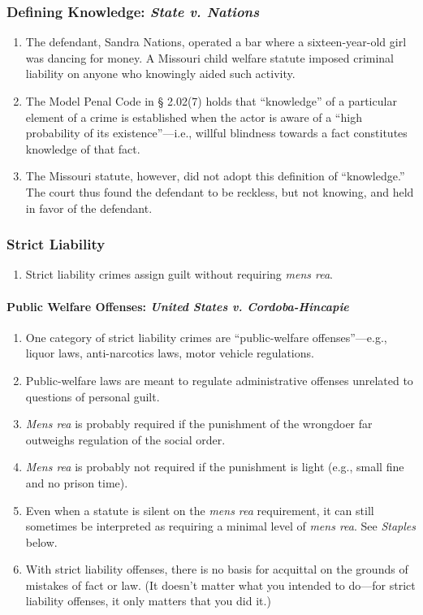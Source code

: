 \subsubsection{Defining Knowledge: \emph{State v. Nations}}

\begin{enumerate}
    \item The defendant, Sandra Nations, operated a bar where a sixteen-year-old girl was dancing for money. A Missouri child welfare statute imposed criminal liability on anyone who knowingly aided such activity.
    \item The Model Penal Code in § 2.02(7) holds that ``knowledge'' of a particular element of a crime is established when the actor is aware of a ``high probability of its existence''---i.e., willful blindness towards a fact constitutes knowledge of that fact.
    \item The Missouri statute, however, did not adopt this definition of ``knowledge.'' The court thus found the defendant to be reckless, but not knowing, and held in favor of the defendant.
\end{enumerate}

\subsubsection{Strict Liability}

\begin{enumerate}
    \item Strict liability crimes assign guilt without requiring \emph{mens rea}.
\end{enumerate}

\paragraph{Public Welfare Offenses: \emph{United States v. Cordoba-Hincapie}}

\begin{enumerate}
    \item One category of strict liability crimes are ``public-welfare offenses''---e.g., liquor laws, anti-narcotics laws, motor vehicle regulations.
    \item Public-welfare laws are meant to regulate administrative offenses unrelated to questions of personal guilt.
    \item \emph{Mens rea} is probably required if the punishment of the wrongdoer far outweighs regulation of the social order.
    \item \emph{Mens rea} is probably not required if the punishment is light (e.g., small fine and no prison time).
    \item Even when a statute is silent on the \emph{mens rea} requirement, it can still sometimes be interpreted as requiring a minimal level of \emph{mens rea}. See \emph{Staples} below.
    \item With strict liability offenses, there is no basis for acquittal on the grounds of mistakes of fact or law. (It doesn't matter what you intended to do---for strict liability offenses, it only matters that you did it.)
\end{enumerate}

